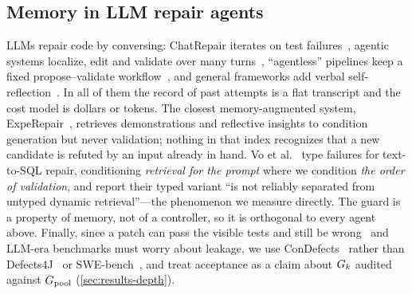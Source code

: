 \subsection{Memory in LLM repair agents}
LLMs repair code by conversing: ChatRepair iterates on test
failures~\cite{xia2024chatrepair}, agentic systems localize, edit and validate
over many turns~\cite{bouzenia2025repairagent,zhang2024autocoderover,%
yang2024sweagent}, ``agentless'' pipelines keep a fixed propose--validate
workflow~\cite{xia2025agentless}, and general frameworks add verbal
self-reflection~\cite{shinn2023reflexion,chen2024selfdebug}. In all of them the
record of past attempts is a flat transcript and the cost model is dollars or
tokens. The closest memory-augmented system,
ExpeRepair~\cite{mu2026experepair}, retrieves demonstrations and reflective
insights to condition generation but never validation; nothing in that index
recognizes that a new candidate is refuted by an input already in hand. Vo et
al.~\cite{vo2026merit} type failures for text-to-SQL repair, conditioning
\emph{retrieval for the prompt} where we condition \emph{the order of
validation}, and report their typed variant ``is not reliably separated from
untyped dynamic retrieval''---the phenomenon we measure directly. The guard is
a property of memory, not of a controller, so it is orthogonal to every agent
above. Finally, since a patch can pass the visible tests and still be
wrong~\cite{xiong2018patchsim} and
LLM-era benchmarks must worry about leakage, we use
ConDefects~\cite{wu2024condefects} rather than
Defects4J~\cite{just2014defects4j} or SWE-bench~\cite{jimenez2024swebench}, and
treat acceptance as a claim about $G_{k}$ audited against $G_{\mathrm{pool}}$
(\cref{sec:results-depth}).
